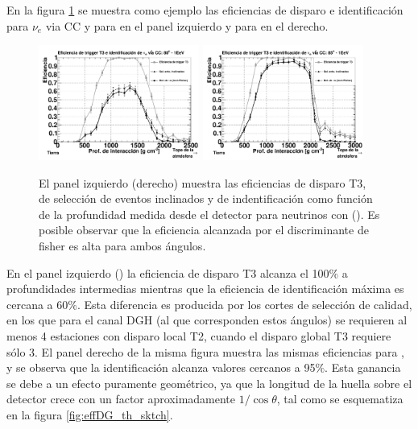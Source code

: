 	En la figura \ref{fig:effDG_th} se muestra como ejemplo las eficiencias de disparo e identificación para $\nu_e$ via CC y  para  en el panel izquierdo y para  en el derecho.
	\begin{figure}[ht!]
		\begin{center}
			\includegraphics[width=0.47\textwidth]{fig/resultadosAuger/eff_1EeV_80}
			\hfill
			\includegraphics[width=0.47\textwidth]{fig/resultadosAuger/eff_1EeV_85}
			\caption{El panel izquierdo (derecho) muestra las eficiencias de disparo T3, de selección de eventos inclinados y de indentificación como función de la profundidad medida desde el detector para neutrinos con  (). Es posible observar que la eficiencia alcanzada por el discriminante de fisher es alta para ambos ángulos.}
			\label{fig:effDG_th}
		\end{center}
	\end{figure}
	En el panel izquierdo () la eficiencia de disparo T3 alcanza el 100$\%$ a profundidades intermedias mientras que la eficiencia de identificación máxima es cercana a 60$\%$.
	Esta diferencia es producida por los cortes de selección de calidad, en los que para el canal DGH (al que corresponden estos ángulos) se requieren al menos 4 estaciones con disparo local T2, cuando el disparo global T3 requiere sólo 3.
	El panel derecho de la misma figura muestra las mismas eficiencias para , y se observa que la identificación alcanza valores cercanos a 95$\%$.
	Esta ganancia se debe a un efecto puramente geométrico, ya que la longitud de la huella sobre el detector crece con un factor aproximadamente $1/\cos\theta$, tal como se esquematiza en la figura \ref{fig:effDG_th_sktch}.
